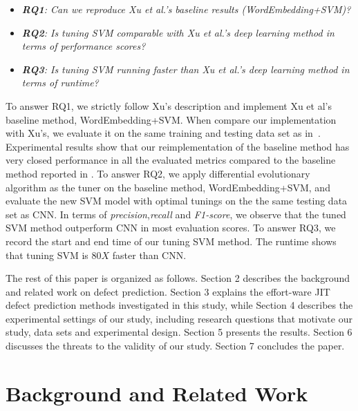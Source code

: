 \documentclass[sigconf,review, anonymous]{acmart}
\theoremstyle{break}
\newcommand{\bi}{\begin{itemize}[leftmargin=0.4cm]}
\newcommand{\ei}{\end{itemize}}
\begin{document}
 \bi
 \item {\it \textbf{RQ1}: Can we reproduce Xu et al.'s baseline results (WordEmbedding+SVM)?}

 
 \item {\it \textbf{RQ2}: Is tuning SVM comparable with Xu et al.'s deep learning method in terms of performance scores?}
 
 \item {\it \textbf{RQ3}: Is tuning SVM running faster than Xu et al.'s deep learning method in terms of runtime?}
 \ei

To answer RQ1, we strictly follow Xu's description and implement Xu et al's
baseline method, WordEmbedding+SVM. When compare our implementation with Xu's,
we evaluate it on the same training and testing data set as in~\cite{xu2016predicting}. Experimental results show that our reimplementation of the baseline method has very closed performance in all the evaluated metrics compared to the baseline method reported in \cite{xu2016predicting}. To answer RQ2,
we apply differential evolutionary algorithm as the tuner on the baseline method,
WordEmbedding+SVM, and evaluate the new SVM model with optimal tunings on the the same testing data set as CNN. In terms of {\it precision},{\it recall} and {\it F1-score}, we observe that the tuned SVM method outperform CNN in most evaluation scores. To answer RQ3, we record the start and end time of our tuning SVM method.
The runtime shows that tuning SVM is $80X$ faster than CNN.


The rest of this paper is organized as follows. Section 2 describes the background and related work on defect prediction.
Section 3 explains the effort-ware JIT defect prediction methods investigated in this study, while Section 4 describes the
experimental settings of our study, including research questions that motivate our study, data sets and experimental design.
Section 5 presents the results. Section 6 discusses the threats to the validity of our study. Section 7 concludes the paper.


\section{Background and Related Work}
\end{document}

